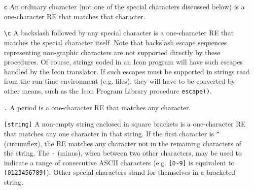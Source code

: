 \texttt{c} An ordinary character (not one of the special characters
discussed below) is a one-character RE that matches that character.

\texttt{{\textbackslash}c} A backslash followed by any special character
is a one-character RE that matches the special character itself. Note
that backslash escape sequences representing non-graphic characters are
not supported directly by these procedures. Of course, strings coded in
an Icon program will have such escapes handled by the Icon translator.
If such escapes must be supported in strings read from the run-time
environment (e.g. files), they will have to be converted by other
means, such as the Icon Program Library procedure \texttt{escape()}.

\texttt{.} A period is a one-character RE that matches any character.

\texttt{[string]} A non-empty string enclosed in square brackets is a
one-character RE that matches any one character in that string. If the
first character is \texttt{{\textquotedbl}\^{}{\textquotedbl}}
(circumflex), the RE matches any character not in the remaining
characters of the string. The \texttt{{\textquotedbl}-{\textquotedbl}}
(minus), when between two other characters, may be used to indicate a
range of consecutive ASCII characters (e.g. \texttt{[0-9]}
is equivalent to \texttt{[0123456789]}). Other special characters stand
for themselves in a bracketed string.

